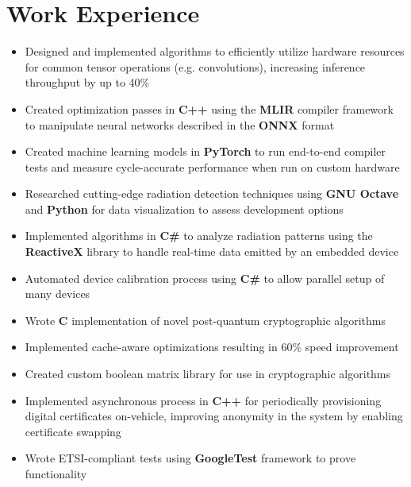 \documentclass{moderncv}
\begin{document}
\makecvtitle
\section{Work Experience}
{\begin{itemize}
    \item Designed and implemented algorithms to efficiently utilize hardware resources for common tensor operations (e.g. convolutions), increasing inference throughput by up to 40\%
    \item Created optimization passes in \textbf{C++} using the \textbf{MLIR} compiler framework to manipulate neural networks described in the \textbf{ONNX} format
    \item Created machine learning models in \textbf{PyTorch} to run end-to-end compiler tests and measure cycle-accurate performance when run on custom hardware
\end{itemize}}

{\begin{itemize}
    \item Researched cutting-edge radiation detection techniques using \textbf{GNU Octave} and \textbf{Python} for data visualization to assess development options
    \item Implemented algorithms in \textbf{C\#} to analyze radiation patterns using the \textbf{ReactiveX} library to handle real-time data emitted by an embedded device
    \item Automated device calibration process using \textbf{C\#} to allow parallel setup of many devices
\end{itemize}}

{\begin{itemize}
    \item Wrote \textbf{C} implementation of novel post-quantum cryptographic algorithms
    \item Implemented cache-aware optimizations resulting in 60\% speed improvement
    \item Created custom boolean matrix library for use in cryptographic algorithms
\end{itemize}}

{\begin{itemize}
    \item Implemented asynchronous process in \textbf{C++} for periodically provisioning digital certificates on-vehicle, improving anonymity in the system by enabling certificate swapping
    \item Wrote ETSI-compliant tests using \textbf{GoogleTest} framework to prove functionality
\end{itemize}}
\end{document}
